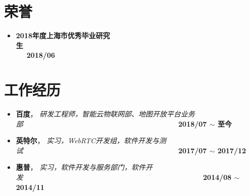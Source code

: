 \documentclass[letterpaper, UTF8, 11pt]{article}
\begin{document}
	\section*{\textbf{荣誉}}\vspace{-0.12in}
	\begin{itemize}
		\item \textbf{2018年度上海市优秀毕业研究生}~~~~~~~~~~~~~~~~~~~~~~~~~~~~~~~~~~~~~~~~~~~~~~~~~~~~~~~~~~~~~~~~~~~~~\textbf{2018/06}
	\end{itemize}
	\vspace{-0.32in}
	
	\section*{\textbf{工作经历}}\vspace{-0.12in}
	\begin{itemize}
		\item \textbf{百度}， \emph{研发工程师，智能云物联网部、地图开放平台业务部}~~~~~~~~~~~~~~~~~~~~~~~~~~~~~~~~~~~~~~~~~~~~\textbf{2018/07 $\sim$ 至今}
		\item \textbf{英特尔}， \emph{实习，WebRTC开发组，软件开发与测试}~~~~~~~~~~~~~~~~~~~~~~~~~~~~~~~~~~~~~~~~~~~~\textbf{2017/07 $\sim$ 2017/12}
		\item \textbf{惠普}， \emph{实习，软件开发与服务部门，软件开发}~~~~~~~~~~~~~~~~~~~~~~~~~~~~~~~~~~~~~~~~~~~~~~~~~~~\textbf{2014/08 $\sim$ 2014/11}
	\end{itemize}
	\vspace{-0.32in}
	
\end{document}
